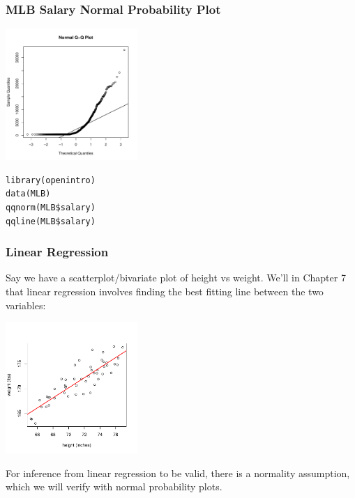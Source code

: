 \documentclass[handout]{beamer}
\newcommand{\blue}[1]{\textcolor{blue2}{#1}}
\begin{document}
\begin{frame}[fragile]
\frametitle{MLB Salary Normal Probability Plot}

\begin{center}
\includegraphics[width=5cm]{figure/MLB_qqplot.pdf}
\end{center}
\begin{verbatim}
library(openintro)
data(MLB)
qqnorm(MLB$salary)
qqline(MLB$salary)
\end{verbatim}
\end{frame}


\begin{frame}
\frametitle{Linear Regression}
Say we have a scatterplot/bivariate plot of height vs weight.  We'll in Chapter 7 that \blue{linear regression} involves finding the \blue{best fitting line} between the two variables:

\begin{center}
\includegraphics[width=5cm]{figure/lec24-003.pdf}
\end{center}

\pause For inference from linear regression to be valid, there is a normality assumption, which we will verify with normal probability plots.  

\end{frame}
\end{document}
